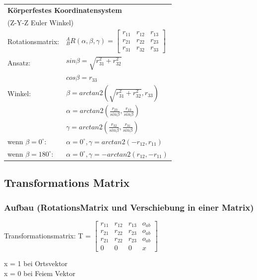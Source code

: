 	\begin{minipage}{9.5cm}
    	\begin{tabular}{|p{2.5cm}|p{6cm}|}
        \hline
        	\multicolumn{2}{|l|}{\textbf{Körperfestes Koordinatensystem}}\\
        	\multicolumn{2}{|l|}{(Z-Y-Z Euler Winkel)}\\
        \hline
        	Rotationsmatrix:
    		& ${^A_B}R(\alpha,\beta,\gamma) = 
    			\begin{bmatrix} 
			    	r_{11} & r_{12} & r_{13} \\
			        r_{21} & r_{22} & r_{23} \\
			        r_{31} & r_{32} & r_{33}                              
			    \end{bmatrix}$ \\
		\hline
			Ansatz:
			& $sin\beta = \sqrt{r^2_{31} + r^2_{32}}$ \\
			& $cos\beta = r_{33}$\\
		\hline
			Winkel:
			& $\beta=arctan2(\sqrt{r^2_{31}+r^2_{32}},r_{33})$\\
			& $\alpha=arctan2(\frac{r_{23}}{sin\beta},\frac{r_{13}}{sin\beta})$\\
			& $\gamma=arctan2(\frac{r_{32}}{sin\beta},\frac{r_{31}}{sin\beta})$\\
		\hline
			wenn $\beta=0^{\circ}$:
			& $\alpha=0^{\circ},\gamma=arctan2(-r_{12},r_{11})$\\
			wenn $\beta=180^{\circ}$:
			& $\alpha=0^{\circ},\gamma=-arctan2(r_{12},-r_{11})$\\
		\hline
        \end{tabular}
    	

    	
    \end{minipage}
	
	\newpage
	\subsection{Transformations Matrix}
	\subsubsection{Aufbau \small{ (RotationsMatrix und Verschiebung in einer
	Matrix)}}
		\begin{minipage}{10cm}
			Transformationsmatrix: T = $ 
    			\begin{bmatrix} 
			    	r_{11} & r_{12} & r_{13} & o_{ab} \\
			        r_{21} & r_{22} & r_{23} & o_{ab} \\
			        r_{21} & r_{22} & r_{23} & o_{ab} \\
			        0 & 0 & 0 & x                              
			    \end{bmatrix}$
		\end{minipage}
		\begin{minipage}{10cm}
    			x = 1 bei Ortsvektor \\
				x = 0 bei Feiem Vektor
		\end{minipage}
